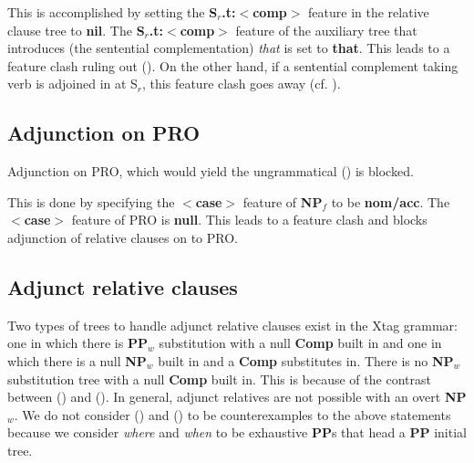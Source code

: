 
This is accomplished by setting the {\bf S$_{r}$.t:$<$comp$>$} feature
in the relative clause tree to {\bf nil}. The {\bf S$_{r}$.t:$<$comp$>$} 
feature of the auxiliary tree that introduces 
(the sentential complementation) {\em that} is set to
{\bf that}. This leads to a feature clash ruling out (). On the
other hand, if a sentential complement taking verb is adjoined
in at S$_{r}$, this feature clash goes away (cf. ).




\subsection{Adjunction on PRO}
Adjunction on PRO, which would yield the ungrammatical () is blocked.

This is done by specifying the {\bf $<$case$>$} feature of {\bf NP$_{f}$} to be
{\bf nom/acc}. The {\bf $<$case$>$} feature of PRO is {\bf null}. This
leads to a feature clash and blocks adjunction of relative clauses on to
PRO.

\subsection{Adjunct relative clauses}
Two types of trees to handle adjunct relative clauses exist in the 
Xtag grammar: one in which there is {\bf PP$_{w}$} substitution with 
a null {\bf Comp} built in and one in which there is a null {\bf NP$_{w}$}
built in and a {\bf Comp} substitutes in. There is no {\bf NP$_{w}$}
substitution tree with a null {\bf Comp} built in. This is because of
the contrast between () and ().
In general, adjunct relatives are not possible with an overt {\bf NP$_{w}$}. 
We do not consider () and () to be counterexamples to 
the above statements because we consider {\em where} and {\em when}
to be exhaustive {\bf PP}s that head a {\bf PP} initial tree.


